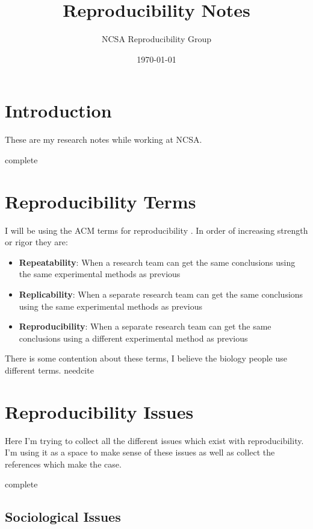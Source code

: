 \documentclass{article}
\title{Reproducibility Notes}
\author{NCSA Reproducibility Group}
\date{\today}
\newcommand{\complete}{
	\gls{complete}
}
\newcommand{\needcite}{
	\gls{needcite}
}
\begin{document}
\maketitle

\tableofcontents

\section{Introduction}

These are my research notes while working at NCSA.

\complete

\section{Reproducibility Terms}

I will be using the ACM terms for reproducibility \cite{acm-badging}. In order of increasing strength or rigor they are:

\begin{itemize}
\item \textbf{Repeatability}: When a research team can get the same conclusions using the same experimental methods as previous
\item \textbf{Replicability}: When a separate research team can get the same conclusions using the same experimental methods as previous
\item \textbf{Reproducibility}: When a separate research team can get the same conclusions using a different experimental method as previous
\end{itemize}

There is some contention about these terms, I believe the biology people use different terms. \needcite

\section{Reproducibility Issues}

Here I'm trying to collect all the different issues which exist with reproducibility. I'm using it as a space to make sense of these issues as well as collect the references which make the case.

\complete

\subsection{Sociological Issues}
\end{document}
